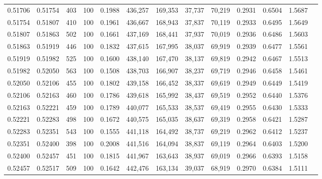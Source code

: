 \begin{tabular}{rrrrrrrrrrrrr}
0.51706 & 0.51754 &   403 & 100 &                                     0.1988 & 436,257 & 169,353 &  37,737 &  70,219 & 0.2931 & 0.6504 & 1.5687 \\
0.51754 & 0.51807 &   410 & 100 &                                     0.1961 & 436,667 & 168,943 &  37,837 &  70,119 & 0.2933 & 0.6495 & 1.5649 \\
0.51807 & 0.51863 &   502 & 100 &                                     0.1661 & 437,169 & 168,441 &  37,937 &  70,019 & 0.2936 & 0.6486 & 1.5603 \\
0.51863 & 0.51919 &   446 & 100 &                                     0.1832 & 437,615 & 167,995 &  38,037 &  69,919 & 0.2939 & 0.6477 & 1.5561 \\
0.51919 & 0.51982 &   525 & 100 &                                     0.1600 & 438,140 & 167,470 &  38,137 &  69,819 & 0.2942 & 0.6467 & 1.5513 \\
0.51982 & 0.52050 &   563 & 100 &                                     0.1508 & 438,703 & 166,907 &  38,237 &  69,719 & 0.2946 & 0.6458 & 1.5461 \\
0.52050 & 0.52106 &   455 & 100 &                                     0.1802 & 439,158 & 166,452 &  38,337 &  69,619 & 0.2949 & 0.6449 & 1.5419 \\
0.52106 & 0.52163 &   460 & 100 &                                     0.1786 & 439,618 & 165,992 &  38,437 &  69,519 & 0.2952 & 0.6440 & 1.5376 \\
0.52163 & 0.52221 &   459 & 100 &                                     0.1789 & 440,077 & 165,533 &  38,537 &  69,419 & 0.2955 & 0.6430 & 1.5333 \\
0.52221 & 0.52283 &   498 & 100 &                                     0.1672 & 440,575 & 165,035 &  38,637 &  69,319 & 0.2958 & 0.6421 & 1.5287 \\
0.52283 & 0.52351 &   543 & 100 &                                     0.1555 & 441,118 & 164,492 &  38,737 &  69,219 & 0.2962 & 0.6412 & 1.5237 \\
0.52351 & 0.52400 &   398 & 100 &                                     0.2008 & 441,516 & 164,094 &  38,837 &  69,119 & 0.2964 & 0.6403 & 1.5200 \\
0.52400 & 0.52457 &   451 & 100 &                                     0.1815 & 441,967 & 163,643 &  38,937 &  69,019 & 0.2966 & 0.6393 & 1.5158 \\
0.52457 & 0.52517 &   509 & 100 &                                     0.1642 & 442,476 & 163,134 &  39,037 &  68,919 & 0.2970 & 0.6384 & 1.5111 \\

\end{tabular}
